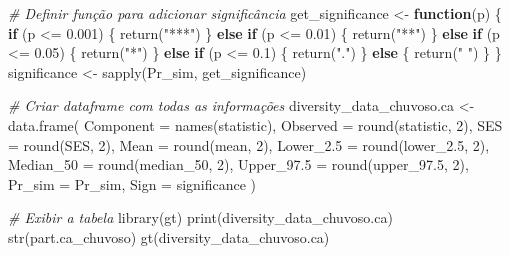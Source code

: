 \documentclass[
  letterpaper,
  DIV=11,
  numbers=noendperiod]{scrartcl}
\newenvironment{Shaded}{}{}
\newcommand{\AttributeTok}[1]{\textcolor[rgb]{0.49,0.56,0.16}{#1}}
\newcommand{\CommentTok}[1]{\textcolor[rgb]{0.38,0.63,0.69}{\textit{#1}}}
\newcommand{\ControlFlowTok}[1]{\textcolor[rgb]{0.00,0.44,0.13}{\textbf{#1}}}
\newcommand{\DecValTok}[1]{\textcolor[rgb]{0.25,0.63,0.44}{#1}}
\newcommand{\FloatTok}[1]{\textcolor[rgb]{0.25,0.63,0.44}{#1}}
\newcommand{\FunctionTok}[1]{\textcolor[rgb]{0.02,0.16,0.49}{#1}}
\newcommand{\NormalTok}[1]{#1}
\newcommand{\OtherTok}[1]{\textcolor[rgb]{0.00,0.44,0.13}{#1}}
\newcommand{\SpecialCharTok}[1]{\textcolor[rgb]{0.25,0.44,0.63}{#1}}
\newcommand{\StringTok}[1]{\textcolor[rgb]{0.25,0.44,0.63}{#1}}
\begin{document}
\begin{Shaded}
\begin{Highlighting}[numbers=left,,]
\CommentTok{\# Definir função para adicionar significância}
\NormalTok{get\_significance }\OtherTok{\textless{}{-}} \ControlFlowTok{function}\NormalTok{(p) \{}
  \ControlFlowTok{if}\NormalTok{ (p }\SpecialCharTok{\textless{}=} \FloatTok{0.001}\NormalTok{) \{}
    \FunctionTok{return}\NormalTok{(}\StringTok{"***"}\NormalTok{)}
\NormalTok{  \} }\ControlFlowTok{else} \ControlFlowTok{if}\NormalTok{ (p }\SpecialCharTok{\textless{}=} \FloatTok{0.01}\NormalTok{) \{}
    \FunctionTok{return}\NormalTok{(}\StringTok{"**"}\NormalTok{)}
\NormalTok{  \} }\ControlFlowTok{else} \ControlFlowTok{if}\NormalTok{ (p }\SpecialCharTok{\textless{}=} \FloatTok{0.05}\NormalTok{) \{}
    \FunctionTok{return}\NormalTok{(}\StringTok{"*"}\NormalTok{)}
\NormalTok{  \} }\ControlFlowTok{else} \ControlFlowTok{if}\NormalTok{ (p }\SpecialCharTok{\textless{}=} \FloatTok{0.1}\NormalTok{) \{}
    \FunctionTok{return}\NormalTok{(}\StringTok{"."}\NormalTok{)}
\NormalTok{  \} }\ControlFlowTok{else}\NormalTok{ \{}
    \FunctionTok{return}\NormalTok{(}\StringTok{" "}\NormalTok{)}
\NormalTok{  \}}
\NormalTok{\}}
\NormalTok{significance }\OtherTok{\textless{}{-}} \FunctionTok{sapply}\NormalTok{(Pr\_sim, get\_significance)}

\CommentTok{\# Criar dataframe com todas as informações}
\NormalTok{diversity\_data\_chuvoso.ca }\OtherTok{\textless{}{-}} \FunctionTok{data.frame}\NormalTok{(}
  \AttributeTok{Component =} \FunctionTok{names}\NormalTok{(statistic),}
  \AttributeTok{Observed =} \FunctionTok{round}\NormalTok{(statistic, }\DecValTok{2}\NormalTok{),}
  \AttributeTok{SES =} \FunctionTok{round}\NormalTok{(SES, }\DecValTok{2}\NormalTok{),}
  \AttributeTok{Mean =} \FunctionTok{round}\NormalTok{(mean, }\DecValTok{2}\NormalTok{),}
  \AttributeTok{Lower\_2.5 =} \FunctionTok{round}\NormalTok{(lower\_2}\FloatTok{.5}\NormalTok{, }\DecValTok{2}\NormalTok{),}
  \AttributeTok{Median\_50 =} \FunctionTok{round}\NormalTok{(median\_50, }\DecValTok{2}\NormalTok{),}
  \AttributeTok{Upper\_97.5 =} \FunctionTok{round}\NormalTok{(upper\_97}\FloatTok{.5}\NormalTok{, }\DecValTok{2}\NormalTok{),}
  \AttributeTok{Pr\_sim =}\NormalTok{ Pr\_sim,}
  \AttributeTok{Sign =}\NormalTok{ significance}
\NormalTok{)}

\CommentTok{\# Exibir a tabela}
\FunctionTok{library}\NormalTok{(gt)}
\FunctionTok{print}\NormalTok{(diversity\_data\_chuvoso.ca)}
\FunctionTok{str}\NormalTok{(part.ca\_chuvoso)}
\FunctionTok{gt}\NormalTok{(diversity\_data\_chuvoso.ca)}


\end{Highlighting}
\end{Shaded}
\end{document}
